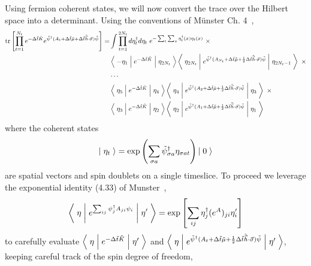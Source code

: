 Using fermion coherent states, we will now convert the trace over the Hilbert space into a determinant.
Using the conventions of M\"{u}nster Ch. 4~\cite{munster},
\begin{align}
	\text{tr}\left[\prod_{t=1}^{N_t} e^{-\Delta \tilde{t}\tilde{K}}  e^{ \tilde{\psi}{}^{\dagger} (A_t + \Delta\tilde{t} \tilde{\mu} + \Delta\tilde{t}\tilde{\vec{h}}\cdot\vec{\sigma}) \tilde{\psi} }\right]
	=& \int \prod_{t=1}^{2N_t} d \eta^{\dagger}_t d\eta_t ~ e^{- \sum_{t}\sum_x \eta^{\dagger}_t(x) \eta_t(x)}~ \times
	\nonumber\\
	&
		\left\langle\; -\eta_1 \;\middle|\; e^{-\Delta \tilde{t}\tilde{K} }\;\middle|\;\eta_{2 N_t}\;\right\rangle
		\left\langle\; \eta_{2 N_t} \;\middle|\; e^{ \tilde{\psi}{}^{\dagger} (A_{N_t} + \Delta\tilde{t}\tilde{\mu} + \frac{1}{2} \Delta\tilde{t}\tilde{\vec{h}}\cdot\vec{\sigma})\tilde{\psi} } \;\middle|\;\eta_{2 N_t-1}\;\right\rangle ~ \times
	\nonumber\\
	&
		\cdots
	\nonumber\\
	&
		\left\langle\; \eta_5 \;\middle|\; e^{-\Delta \tilde{t}\tilde{K} }\;\middle|\;\eta_{4}\;\right\rangle
		\left\langle\; \eta_4 \;\middle|\; e^{ \tilde{\psi}{}^{\dagger} (A_{2} + \Delta\tilde{t}\tilde{\mu} + \frac{1}{2} \Delta\tilde{t}\tilde{\vec{h}}\cdot\vec{\sigma}) \tilde{\psi}} \;\middle|\;\eta_3\;\right\rangle ~ \times
	\nonumber\\
	&
		\left\langle\; \eta_3 \;\middle|\; e^{-\Delta \tilde{t}\tilde{K} }\;\middle|\;\eta_{2}\;\right\rangle
		\left\langle\; \eta_2 \;\middle|\; e^{ \tilde{\psi}{}^{\dagger} (A_{1} + \Delta\tilde{t}\tilde{\mu} + \frac{1}{2} \Delta\tilde{t}\tilde{\vec{h}}\cdot\vec{\sigma}) \tilde{\psi}} \;\middle|\;\eta_1\;\right\rangle
	\label{eq:coherent state trace}
\end{align}
where the coherent states
\begin{equation*}
	\left|\;\eta_t\;\right\rangle = \exp\left( \sum_{\sigma a} \tilde{\psi}^{\dagger}_{\sigma a} \eta_{\sigma a t} \right) \left|\;0\;\right\rangle
\end{equation*}
are spatial vectors and spin doublets on a single timeslice.
To proceed we leverage the exponential identity (4.33) of Munster~\cite{munster},
\begin{equation}
	\left\langle\; \eta \;\middle|\; e^{\sum_{ij} \psi^{\dagger}_j A_{ji} \psi_i} \;\middle|\; \eta' \;\right\rangle
	=
	\exp\left[ \sum_{i j} \eta^{\dagger}_j (e^A)_{ji} \eta'_i \right]
\end{equation}
to carefully evaluate $\left\langle\;\eta\;\middle|\; e^{-\Delta \tilde{t}\tilde{K}} \;\middle|\;\eta'\;\right\rangle$ and $\left\langle\;\eta\;\middle|\; e^{\tilde{\psi}{}^{\dagger}(A_t + \Delta \tilde{t} \tilde{\mu} + \frac{1}{2} \Delta\tilde{t}\tilde{\vec{h}}\cdot\vec{\sigma})\tilde{\psi}} \;\middle|\;\eta'\;\right\rangle$, keeping careful track of the spin degree of freedom,
